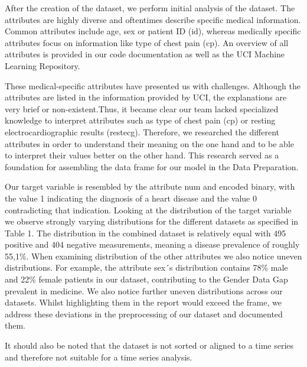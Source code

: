 After the creation of the dataset, we perform initial analysis of the dataset. The attributes are highly diverse and oftentimes describe specific medical information. Common attributes include age, sex or patient ID (id), whereas medically specific attributes focus on information like type of chest pain (cp). An overview of all attributes is provided in our code documentation as well as the UCI Machine Learning Repository. 


These medical-specific attributes have presented us with challenges. Although the attributes are listed in the information provided by UCI, the explanations are very brief or non-existent.Thus, it became clear our team lacked specialized knowledge to interpret attributes such as type of chest pain (cp) or resting electrocardiographic results (restecg). Therefore, we researched the different attributes in order to understand their meaning on the one hand and to be able to interpret their values better on the other hand. This research served as a foundation for assembling the data frame for our model in the Data Preparation. 

Our target variable is resembled by the attribute num and encoded binary, with the value 1 indicating the diagnosis of a heart disease and the value 0 contradicting that indication. Looking at the distribution of the target variable we observe strongly varying distributions for the different datasets as specified in Table 1. The distribution in the combined dataset is relatively equal with 495 positive and 404 negative measurements, meaning a disease prevalence of roughly 55,1\%. When examining distribution of the other attributes we also notice uneven distributions. For example, the attribute sex´s distribution contains 78\% male and 22\% female patients in our dataset, contributing to the Gender Data Gap prevalent in medicine. We also notice further uneven distributions across our datasets. Whilst highlighting them in the report would exceed the frame, we address these deviations in the preprocessing of our dataset and documented them.  

It should also be noted that the dataset is not sorted or aligned to a time series and therefore not suitable for a time series analysis. 

